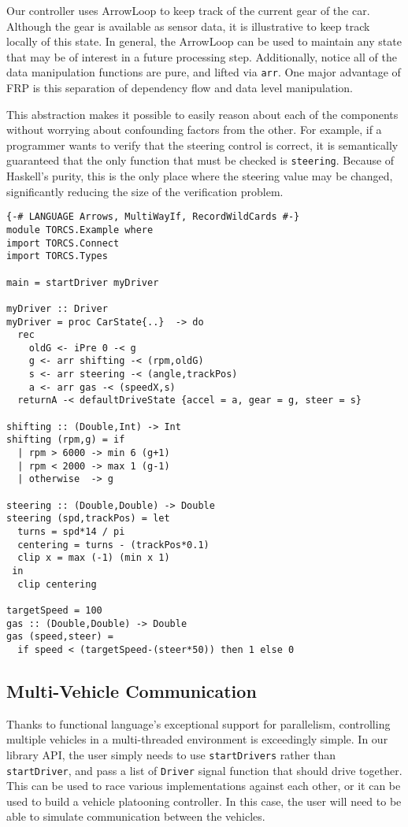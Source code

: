 Our controller uses ArrowLoop to keep track of the current gear of the car.
Although the gear is available as sensor data, it is illustrative to keep track locally of this state.
In general, the ArrowLoop can be used to maintain any state that may be of interest in a future processing step.
Additionally, notice all of the data manipulation functions are pure, and lifted via \texttt{arr}.
One major advantage of FRP is this separation of dependency flow and data level manipulation. 

This abstraction makes it possible to easily reason about each of the components without worrying about confounding factors from the other.
For example, if a programmer wants to verify that the steering control is correct, it is semantically guaranteed that the only function that must be checked is \texttt{steering}.
Because of Haskell's purity, this is the only place where the steering value may be changed, significantly reducing the size of the verification problem.

\begin{lstlisting}[float,floatplacement=TR,caption=A complete basic controller in Yampa, label=lst:driver]
{-# LANGUAGE Arrows, MultiWayIf, RecordWildCards #-}
module TORCS.Example where
import TORCS.Connect
import TORCS.Types

main = startDriver myDriver

myDriver :: Driver
myDriver = proc CarState{..}  -> do
  rec 
    oldG <- iPre 0 -< g
    g <- arr shifting -< (rpm,oldG)
    s <- arr steering -< (angle,trackPos)
    a <- arr gas -< (speedX,s)
  returnA -< defaultDriveState {accel = a, gear = g, steer = s}

shifting :: (Double,Int) -> Int
shifting (rpm,g) = if 
  | rpm > 6000 -> min 6 (g+1)
  | rpm < 2000 -> max 1 (g-1)
  | otherwise  -> g
 
steering :: (Double,Double) -> Double
steering (spd,trackPos) = let
  turns = spd*14 / pi
  centering = turns - (trackPos*0.1)
  clip x = max (-1) (min x 1)
 in
  clip centering

targetSpeed = 100
gas :: (Double,Double) -> Double
gas (speed,steer) = 
  if speed < (targetSpeed-(steer*50)) then 1 else 0
\end{lstlisting}


\subsection{Multi-Vehicle Communication}

Thanks to functional language's exceptional support for parallelism, controlling multiple vehicles in a multi-threaded environment is exceedingly simple. 
In our library API, the user simply needs to use \texttt{startDrivers} rather than \texttt{startDriver}, and pass a list of \texttt{Driver} signal function that should drive together.
This can be used to race various implementations against each other, or it can be used to build a vehicle platooning controller.
In this case, the user will need to be able to simulate communication between the vehicles.

